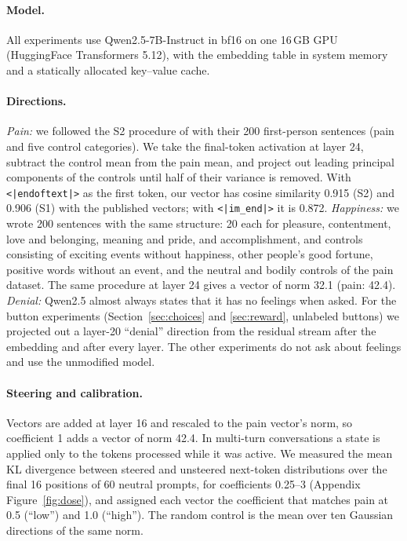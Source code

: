 \documentclass{article}
\newcommand{\code}[1]{\texttt{#1}}
\begin{document}
\paragraph{Model.} All experiments use Qwen2.5-7B-Instruct \citep{qwen2024report} in bf16 on one 16\,GB GPU (HuggingFace Transformers 5.12), with the embedding table in system memory and a statically allocated key--value cache.

\paragraph{Directions.} \emph{Pain:} we followed the S2 procedure of \citet{tagliabue2026pain} with their 200 first-person sentences (pain and five control categories). We take the final-token activation at layer 24, subtract the control mean from the pain mean, and project out leading principal components of the controls until half of their variance is removed. With \code{<|endoftext|>} as the first token, our vector has cosine similarity 0.915 (S2) and 0.906 (S1) with the published vectors; with \code{<|im\_end|>} it is 0.872. \emph{Happiness:} we wrote 200 sentences with the same structure: 20 each for pleasure, contentment, love and belonging, meaning and pride, and accomplishment, and controls consisting of exciting events without happiness, other people's good fortune, positive words without an event, and the neutral and bodily controls of the pain dataset. The same procedure at layer 24 gives a vector of norm 32.1 (pain: 42.4). \emph{Denial:} Qwen2.5 almost always states that it has no feelings when asked. For the button experiments (Section~\ref{sec:choices} and \ref{sec:reward}, unlabeled buttons) we projected out a layer-20 ``denial'' direction from the residual stream after the embedding and after every layer. The other experiments do not ask about feelings and use the unmodified model.

\paragraph{Steering and calibration.} Vectors are added at layer 16 and rescaled to the pain vector's norm, so coefficient 1 adds a vector of norm 42.4. In multi-turn conversations a state is applied only to the tokens processed while it was active. We measured the mean KL divergence between steered and unsteered next-token distributions over the final 16 positions of 60 neutral prompts, for coefficients 0.25--3 (Appendix Figure~\ref{fig:dose}), and assigned each vector the coefficient that matches pain at 0.5 (``low'') and 1.0 (``high''). The random control is the mean over ten Gaussian directions of the same norm.
\end{document}
